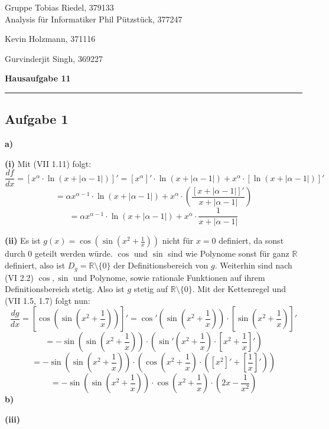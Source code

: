 \documentclass[a4paper,graphics,11pt]{article}
\newcommand{\aufgabe}[1]{\subsection*{Aufgabe #1}}
\begin{document}
\noindent Gruppe              \hfill Tobias Riedel, 379133 \\
\noindent Analysis für Informatiker             \hfill Phil Pützstück, 377247 \\
\strut\hfill Kevin Holzmann, 371116\\
\strut\hfill Gurvinderjit Singh, 369227
\begin{center}
	\LARGE{\textbf{Hausaufgabe 11}}
\end{center}
\begin{center}
\rule[0.1ex]{\textwidth}{1pt}
\end{center}



\aufgabe{1}
\textbf{a)}

\textbf{(i)}
Mit (VII 1.11) folgt:
$$
    \frac{df}{dx} = \left[x^{\alpha} \cdot \ln\left(x+|\alpha-1|\right)\right]'
    = \left[x^{\alpha}\right]'\cdot \ln(x+|\alpha-1|) + x^{\alpha} \cdot [\ln(x+|\alpha-1|)]'
$$$$
    = \alpha x^{\alpha-1}\cdot \ln(x+|\alpha-1|)
        + x^{\alpha} \cdot \left(\frac{[x+|\alpha-1|]'}{x+|\alpha-1|}\right)
$$$$
    = \alpha x^{\alpha-1}\cdot \ln(x+|\alpha-1|)
        + x^{\alpha} \cdot \frac{1}{x+|\alpha-1|}
$$



\textbf{(ii)}
Es ist $g(x) = \cos\left(\sin\left(x^2+\frac{1}{x}\right)\right)$ nicht für $x = 0$ definiert,
da sonst durch $0$ geteilt werden würde. $\cos$ und $\sin$ sind wie Polynome sonst für ganz
$\mathbb{R}$ definiert, also ist $D_g =  \mathbb{R}\setminus \{0\}$ der Definitionsbereich
von $g$. Weiterhin sind nach (VI 2.2) $\cos, \sin$  und Polynome, sowie rationale Funktionen
auf ihrem Definitionsbereich stetig. Also ist $g$ stetig auf $\mathbb{R}\setminus\{0\}$.
Mit der Kettenregel und (VII 1.5, 1.7) folgt nun:
$$
    \frac{dg}{dx} = \left[\cos\left(\sin\left(x^2+\frac{1}{x}\right)\right)\right]'
    = \cos'\left(\sin\left(x^2+\frac{1}{x}\right)\right)\cdot \left[\sin\left(x^2+\frac{1}{x}\right)\right]'
$$$$
    = -\sin\left(\sin\left(x^2+\frac{1}{x}\right)\right) \cdot \left(\sin'\left(x^2+\frac{1}{x}\right)\cdot\left[x^2+\frac{1}{x}\right]'\right)
$$$$
    = -\sin\left(\sin\left(x^2+\frac{1}{x}\right)\right) \cdot \left(\cos\left(x^2+\frac{1}{x}\right)\cdot\left(\left[x^2\right]'+\left[\frac{1}{x}\right]'\right)\right)
$$$$
    = -\sin\left(\sin\left(x^2+\frac{1}{x}\right)\right) \cdot \cos\left(x^2+\frac{1}{x}\right)\cdot\left(2x-\frac{1}{x^2}\right)
$$
\newpage
\textbf{b)}

\textbf{(iii)}
\end{document}
